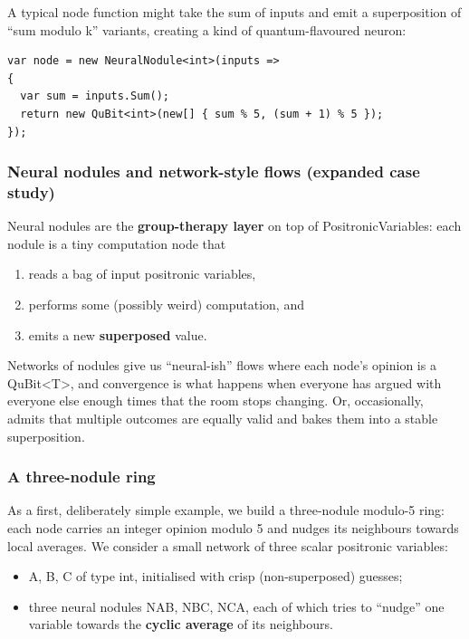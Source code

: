 \documentclass[a4paper,11pt]{article}
\begin{document}
A typical node function might take the sum of inputs and emit a superposition of ``sum modulo k'' variants, creating a kind of quantum-flavoured neuron:

\begin{lstlisting}[style=codeblock]
var node = new NeuralNodule<int>(inputs =>
{
  var sum = inputs.Sum();
  return new QuBit<int>(new[] { sum % 5, (sum + 1) % 5 });
});
\end{lstlisting}

\subsubsection{Neural nodules and network-style flows (expanded case study)}

Neural nodules are the \textbf{group-therapy layer} on top of PositronicVariables: each nodule is a tiny computation node that

\begin{enumerate}
\def\labelenumi{\arabic{enumi}.}
\item
  reads a bag of input positronic variables,
\item
  performs some (possibly weird) computation, and
\item
  emits a new \textbf{superposed} value.
\end{enumerate}

{\raggedright
Networks of nodules give us ``neural-ish'' flows where each node's opinion is
a QuBit\textless T\textgreater, and convergence is what happens when everyone
has argued with everyone else enough times that the room stops changing. Or,
occasionally, admits that multiple outcomes are equally valid and bakes them
into a stable superposition.\par}

\subsubsection{A three-nodule ring}

\label{sec:three-nodule-ring}

As a first, deliberately simple example, we build a three-nodule modulo-5 ring: each node carries an integer opinion modulo 5 and nudges its neighbours towards local averages. We consider a small network of three scalar positronic variables:

\begin{itemize}
\item
  A, B, C of type int, initialised with crisp (non-superposed) guesses;
\item
  three neural nodules NAB, NBC, NCA, each of which tries to ``nudge'' one variable towards the \textbf{cyclic average} of its neighbours.
\end{itemize}
\end{document}

